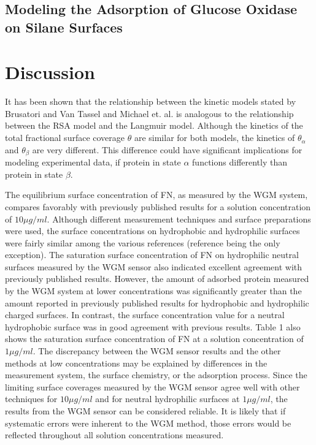 \subsection{Modeling the Adsorption of Glucose Oxidase on Silane Surfaces}


\section{Discussion}

It has been shown that the relationship between the kinetic models
stated by Brusatori and Van Tassel \cite{Brusatori1999} and Michael
et. al. \cite{Michael2003} is analogous to the relationship between
the RSA model and the Langmuir model. Although the kinetics of the
total fractional surface coverage $\theta$ are similar for both models,
the kinetics of $\theta_{\alpha}$ and $\theta_{\beta}$ are very
different. This difference could have significant implications for
modeling experimental data, if protein in state $\alpha$ functions
differently than protein in state $\beta$.

The equilibrium surface concentration of FN, as measured by the WGM
system, compares favorably with previously published results for a
solution concentration of $10\mu g/ml$. Although different measurement
techniques and surface preparations were used, the surface concentrations
on hydrophobic and hydrophilic surfaces were fairly similar among
the various references (reference \cite{Lee2006} being the only exception).
The saturation surface concentration of FN on hydrophilic neutral
surfaces measured by the WGM sensor also indicated excellent agreement
with previously published results. However, the amount of adsorbed
protein measured by the WGM system at lower concentrations was significantly
greater than the amount reported in previously published results for
hydrophobic and hydrophilic charged surfaces. In contrast, the surface
concentration value for a neutral hydrophobic surface was in good
agreement with previous results. Table 1 also shows the saturation
surface concentration of FN at a solution concentration of $1\mu g/ml$.
The discrepancy between the WGM sensor results and the other methods
at low concentrations may be explained by differences in the measurement
system, the surface chemistry, or the adsorption process. Since the
limiting surface coverages measured by the WGM sensor agree well with
other techniques for $10\mu g/ml$ and for neutral hydrophilic surfaces
at $1\mu g/ml$, the results from the WGM sensor can be considered
reliable. It is likely that if systematic errors were inherent to
the WGM method, those errors would be reflected throughout all solution
concentrations measured. 

